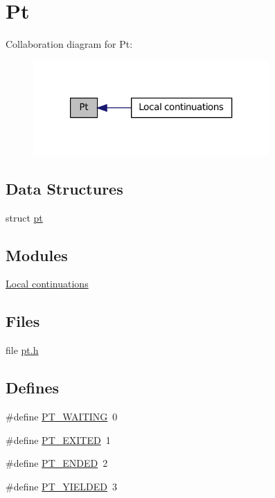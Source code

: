 \hypertarget{group__pt}{
\section{Pt}
\label{group__pt}
}


Collaboration diagram for Pt:
\nopagebreak
\begin{figure}[H]
\begin{center}
\leavevmode
\includegraphics[width=256pt]{group__pt}
\end{center}
\end{figure}


\subsection*{Data Structures}
\begin{DoxyCompactItemize}
\item 
struct \hyperlink{structpt}{pt}
\end{DoxyCompactItemize}
\subsection*{Modules}
\begin{DoxyCompactItemize}
\item 
\hyperlink{group__lc}{Local continuations}
\end{DoxyCompactItemize}
\subsection*{Files}
\begin{DoxyCompactItemize}
\item 
file \hyperlink{pt_8h}{pt.h}
\end{DoxyCompactItemize}
\subsection*{Defines}
\begin{DoxyCompactItemize}
\item 
\#define \hyperlink{group__pt_ga7b5319b5b65761a845fcd1500fde4cdc}{PT\_\-WAITING}~0
\item 
\#define \hyperlink{group__pt_gacfae9053e5c107a1aed6b228c917d2ea}{PT\_\-EXITED}~1
\item 
\#define \hyperlink{group__pt_ga9ff1e8936a8a26bff54c05f8a989b93b}{PT\_\-ENDED}~2
\item 
\#define \hyperlink{group__pt_gae469332907e0617d72d5e2dd4297119d}{PT\_\-YIELDED}~3
\end{DoxyCompactItemize}
